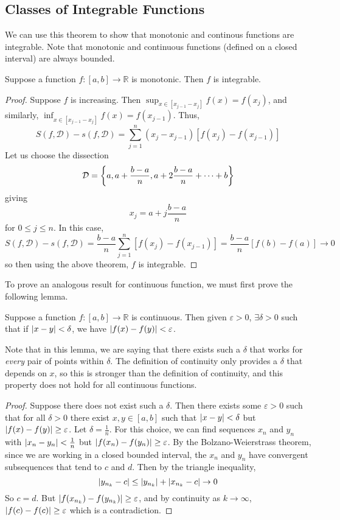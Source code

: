 \documentclass{article}
\begin{document}
\subsection{Classes of Integrable Functions}
We can use this theorem to show that monotonic and continous functions are integrable. Note that monotonic and continuous functions (defined on a closed interval) are always bounded.
\begin{theorem}
    Suppose a function $f \colon [a, b] \to \mathbb R$ is monotonic. Then $f$ is integrable.
\end{theorem}
\begin{proof}
    Suppose $f$ is increasing. Then $\sup_{x \in [x_{j-1} - x_j]} f(x) = f(x_j)$, and similarly, $\inf_{x \in [x_{j-1} - x_j]} f(x) = f(x_{j-1})$. Thus,
    \[ S(f, \mathcal D) - s(f, \mathcal D) = \sum_{j=1}^n (x_j - x_{j-1}) \left[ f(x_j) - f(x_{j-1}) \right] \]
    Let us choose the dissection
    \[ \mathcal D = \qty{ a, a + \frac{b-a}{n}, a + 2\frac{b-a}{n} + \dots + b } \]
    giving
    \[ x_j = a + j\frac{b-a}{n} \]
    for $0 \leq j \leq n$. In this case,
    \[ S(f, \mathcal D) - s(f, \mathcal D) = \frac{b-a}{n} \sum_{j=1}^n \left[ f(x_j) - f(x_{j-1}) \right] = \frac{b-a}{n} \left[ f(b) - f(a) \right] \to 0 \]
    so then using the above theorem, $f$ is integrable.
\end{proof}
\noindent To prove an analogous result for continuous function, we must first prove the following lemma.
\begin{lemma}
    Suppose a function $f \colon [a, b] \to \mathbb R$ is continuous. Then given $\varepsilon > 0$, $\exists \delta > 0$ such that if $\abs{x-y} < \delta$, we have $\abs{f(x) - f(y)} < \varepsilon$.
\end{lemma}
\noindent Note that in this lemma, we are saying that there exists such a $\delta$ that works for \textit{every} pair of points within $\delta$. The definition of continuity only provides a $\delta$ that depends on $x$, so this is stronger than the definition of continuity, and this property does not hold for all continuous functions.
\begin{proof}
    Suppose there does not exist such a $\delta$. Then there exists some $\varepsilon > 0$ such that for all $\delta > 0$ there exist $x, y \in [a, b]$ such that $\abs{x-y} < \delta$ but $\abs{f(x) - f(y)} \geq \varepsilon$. Let $\delta = \frac{1}{n}$. For this choice, we can find sequences $x_n$ and $y_n$ with $\abs{x_n - y_n} < \frac{1}{n}$ but $\abs{f(x_n) - f(y_n)} \geq \varepsilon$. By the Bolzano-Weierstrass theorem, since we are working in a closed bounded interval, the $x_n$ and $y_n$ have convergent subsequences that tend to $c$ and $d$. Then by the triangle inequality,
    \[ \abs{y_{n_k} - c} \leq \abs{y_{n_k}} + \abs{x_{n_k} - c} \to 0 \]
    So $c = d$. But $\abs{f(x_{n_k}) - f(y_{n_k})} \geq \varepsilon$, and by continuity as $k \to \infty$, $\abs{f(c) - f(c)} \geq \varepsilon$ which is a contradiction.
\end{proof}
\end{document}

